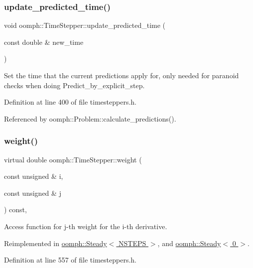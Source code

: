 \subsubsection{\texorpdfstring{update\+\_\+predicted\+\_\+time()}{update\_predicted\_time()}}
{\footnotesize\ttfamily void oomph\+::\+Time\+Stepper\+::update\+\_\+predicted\+\_\+time (\begin{DoxyParamCaption}\item[{const double \&}]{new\+\_\+time }\end{DoxyParamCaption})\hspace{0.3cm}{\ttfamily [inline]}}

Set the time that the current predictions apply for, only needed for paranoid checks when doing Predict\+\_\+by\+\_\+explicit\+\_\+step. 

Definition at line 400 of file timesteppers.\+h.



Referenced by oomph\+::\+Problem\+::calculate\+\_\+predictions().

\mbox{\label{classoomph_1_1TimeStepper_a4cb0aecb044b77ba0553cdd54b586d8a}} 
\subsubsection{\texorpdfstring{weight()}{weight()}}
{\footnotesize\ttfamily virtual double oomph\+::\+Time\+Stepper\+::weight (\begin{DoxyParamCaption}\item[{const unsigned \&}]{i,  }\item[{const unsigned \&}]{j }\end{DoxyParamCaption}) const\hspace{0.3cm}{\ttfamily [inline]}, {\ttfamily [virtual]}}



Access function for j-\/th weight for the i-\/th derivative. 



Reimplemented in \hyperlink{classoomph_1_1Steady_a34c993309f0a5c4c1cbf35ceef86f01b}{oomph\+::\+Steady$<$ N\+S\+T\+E\+P\+S $>$}, and \hyperlink{classoomph_1_1Steady_a34c993309f0a5c4c1cbf35ceef86f01b}{oomph\+::\+Steady$<$ 0 $>$}.



Definition at line 557 of file timesteppers.\+h.



